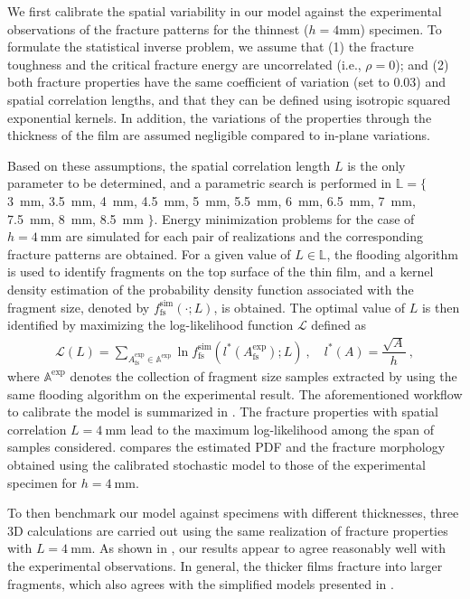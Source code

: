 We first calibrate the spatial variability in our model against the experimental observations of the fracture patterns for the thinnest ($h = 4$mm) specimen. To formulate the statistical inverse problem, we assume that (1) the fracture toughness and the critical fracture energy are uncorrelated (i.e., $\rho = 0$); and (2) both fracture properties have the same coefficient of variation (set to 0.03) and spatial correlation lengths, and that they can be defined using isotropic squared exponential kernels. In addition, the variations of the properties through the thickness of the film are assumed negligible compared to in-plane variations.

Based on these assumptions, the spatial correlation length $L$ is the only parameter to be determined, and a parametric search is performed in $\mathbb{L} = \{$ \SI{3}{\milli\meter}, \SI{3.5}{\milli\meter}, \SI{4}{\milli\meter}, \SI{4.5}{\milli\meter}, \SI{5}{\milli\meter}, \SI{5.5}{\milli\meter}, \SI{6}{\milli\meter}, \SI{6.5}{\milli\meter}, \SI{7}{\milli\meter}, \SI{7.5}{\milli\meter}, \SI{8}{\milli\meter}, \SI{8.5}{\milli\meter} $\}$. Energy minimization problems for the case of $h = \SI{4}{\milli\meter}$ are simulated for each pair of realizations and the corresponding fracture patterns are obtained. For a given value of $L \in \mathbb{L}$, the flooding algorithm is used to identify fragments on the top surface of the thin film, and a kernel density estimation of the probability density function associated with the fragment size, denoted by $f_\text{fs}^\text{sim}(\cdot; L)$, is obtained. The optimal value of $L$ is then identified by maximizing the log-likelihood function $\mathcal{L}$ defined as
\begin{align}
  \mathcal{L}(L) = \sum_{A_\text{fs}^\text{exp} \in \mathbb{A}^\text{exp}} \ln{f_\text{fs}^\text{sim}(l^*(A_\text{fs}^\text{exp}); L)}~, \quad l^*(A) = \dfrac{\sqrt{A}}{h}~,
\end{align}
where $\mathbb{A}^\text{exp}$ denotes the collection of fragment size samples extracted by using the same flooding algorithm on the experimental result.
The aforementioned workflow to calibrate the model is summarized in . The fracture properties with spatial correlation $L = \SI{4}{\milli\meter}$ lead to the maximum log-likelihood among the span of samples considered.  compares the estimated PDF and the fracture morphology obtained using the calibrated stochastic model to those of the experimental specimen for $h = \SI{4}{\milli\meter}$.



To then benchmark our model against specimens with different thicknesses, three 3D calculations are carried out using the same realization of fracture properties with $L = \SI{4}{\milli\meter}$. As shown in ,
our results appear to agree reasonably well with the experimental observations. In general, the thicker films fracture into larger fragments, which also agrees with the simplified models presented in .


